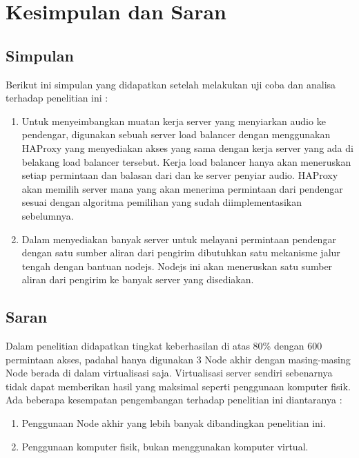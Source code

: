 \chapter{Kesimpulan dan Saran}

\section{Simpulan}
Berikut ini simpulan yang didapatkan setelah melakukan uji coba dan analisa terhadap penelitian ini :

\begin{enumerate}
	\item Untuk menyeimbangkan muatan kerja server yang menyiarkan audio ke pendengar, digunakan sebuah server load balancer dengan menggunakan HAProxy yang menyediakan akses yang sama dengan kerja server yang ada di belakang load balancer tersebut. Kerja load balancer hanya akan meneruskan setiap permintaan dan balasan dari dan ke server penyiar audio. HAProxy akan memilih server mana yang akan menerima permintaan dari pendengar sesuai dengan algoritma pemilihan yang sudah diimplementasikan sebelumnya.
	
	\item Dalam menyediakan banyak server untuk melayani permintaan pendengar dengan satu sumber aliran dari pengirim dibutuhkan satu mekanisme jalur tengah dengan bantuan nodejs. Nodejs ini akan meneruskan satu sumber aliran dari pengirim ke banyak server yang disediakan. 
	
\end{enumerate}


\section{Saran}

Dalam penelitian didapatkan tingkat keberhasilan di atas 80\% dengan 600 permintaan akses, padahal hanya digunakan 3 Node akhir dengan masing-masing Node berada di dalam virtualisasi saja. Virtualisasi server sendiri sebenarnya tidak dapat memberikan hasil yang maksimal seperti penggunaan komputer fisik. Ada beberapa kesempatan pengembangan terhadap penelitian ini diantaranya :

\begin{enumerate}
	\item Penggunaan Node akhir yang lebih banyak dibandingkan penelitian ini.
	\item Penggunaan komputer fisik, bukan menggunakan komputer virtual.
\end{enumerate}


